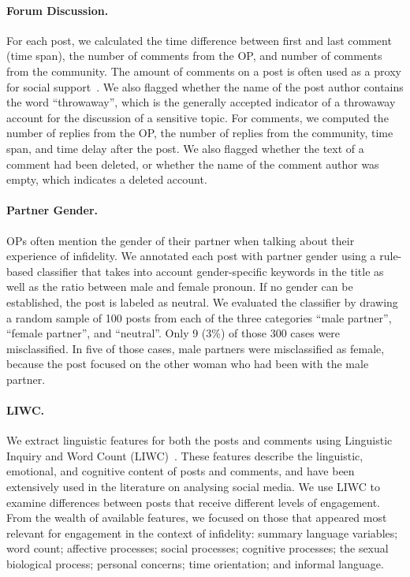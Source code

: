 \paragraph{Forum Discussion.} For each post, we calculated the time difference between first and last comment (time span), the number of comments from the OP, and number of comments from the community. The amount of comments on a post is often used as a proxy for social support~\cite{balani2015detecting}. We also flagged whether the name of the post author contains the word ``throwaway'', which is the generally accepted indicator of a throwaway account for the discussion of a sensitive topic.  For comments, we computed the number of replies from the OP, the number of replies from the community, time span, and time delay after the post. We also flagged whether the text of a comment had been deleted, or whether the name of the comment author was empty, which indicates a deleted account.  

\paragraph{Partner Gender.} OPs often mention the gender of their partner when talking about their experience of infidelity. We annotated each post with partner gender using a rule-based classifier that takes into account gender-specific keywords in the title as well as the ratio between male and female pronoun. If no gender can be established, the post is labeled as neutral. We evaluated the classifier by drawing a random sample of 100 posts from each of the three categories ``male partner'', ``female partner'', and ``neutral''. Only 9 (3\%) of those 300 cases were misclassified. In five of those cases, male partners were misclassified as female, because the post focused on the other woman who had been with the male partner. 

\paragraph{LIWC.} We extract linguistic features for both the posts and comments using Linguistic Inquiry and Word Count (LIWC)~\cite{Pennebaker07}. These features describe the linguistic, emotional, and cognitive content of posts and comments, and have been extensively used in the literature on analysing social media. We use LIWC to examine differences between posts that receive different levels of engagement. From the wealth of available features, we focused on those that appeared most relevant for engagement in the context of infidelity: summary language variables; word count; affective processes; social processes; cognitive processes; the sexual biological process; personal concerns; time orientation; and informal language.


